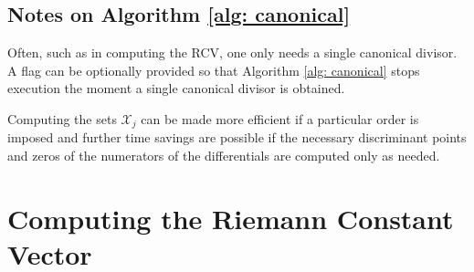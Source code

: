 \documentclass[12]{article}
\begin{document}
\subsection{Notes on Algorithm \ref{alg: canonical}}

Often, such as in computing the RCV, one only needs a single canonical
divisor. A flag can be optionally provided so that Algorithm \ref{alg:
  canonical} stops execution the moment a single canonical divisor is
obtained.

Computing the sets $\mathcal{X}_j$ can be made more efficient if a
particular order is imposed and further time savings are possible if the
necessary discriminant points and zeros of the numerators of the
differentials are computed only as needed.


\section{Computing the Riemann Constant Vector}
\end{document}
